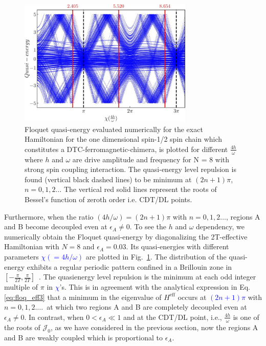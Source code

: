 \documentclass[%
nofootinbib,
reprint,
superscriptaddress,
amsmath,amssymb,showkeys,
aps,
prb,
]{revtex4-2}
\newcommand{\blue}[1]{\textcolor{blue}{#1}}
\begin{document}
	\begin{figure}
		\centering
		\includegraphics[width=8.3cm]{quasienergy_8_lores.jpeg}	
		\caption{Floquet quasi-energy evaluated numerically for the exact Hamiltonian for the one dimensional spin-1/2 spin chain which constitutes a DTC-ferromagnetic-chimera, is plotted for different $\frac{4h}{\omega}$ where $h$ and $\omega$ are drive amplitude and frequency for N = 8 with strong spin coupling interaction. The quasi-energy level repulsion is found (vertical black dashed lines) to be minimum at $(2n+1)\pi$, $n=0,1,2\dots$ The vertical red solid lines represent the roots of Bessel's function of zeroth order i.e. CDT/DL points.}
		\label{Fig:quasienergy}
	\end{figure}
	
	Furthermore, when the ratio $({4h}/{\omega}) = (2n+1)\pi$ with $n = 0,1,2\dots$, regions A and B become decoupled even at $\epsilon_A \neq 0$. To see the $h$ and $\omega$ dependency, we numerically obtain the Floquet quasi-energy by diagonalizing the 2T-effective Hamiltonian with $N=8$ and $\epsilon_A=0.03$. Its quasi-energies with different parameters \blue{$\chi( = {4h}/{\omega})$} are plotted in Fig.~\ref{Fig:quasienergy}. The distribution of the quasi-energy exhibits a regular periodic pattern confined in a Brillouin zone in $[-\frac{\pi}{2T}, \frac{\pi}{2T}]$~\cite{dutta2014}. The quasienergy level repulsion is the minimum at each odd integer multiple of $\pi$ in  \blue{$\chi$}'s. This is in agreement with the analytical expression in Eq.\eqref{eq:floq_eff3} that a minimum in the eigenvalue of $H^{\mathrm{eff}}$ occurs at \blue{$(2n+1)\pi$} with $n=0,1,2\dots$.\, at which two regions A and B are completely decoupled even at $\epsilon_A \neq 0$. In contrast, when $0 < \epsilon_A \ll 1 $ and at the CDT/DL point, i.e., $\frac{4h}{\omega}$ is one of the roots of $\mathcal{J}_0$, as we have considered in the previous section, now the regions A and B are weakly coupled which is proportional to $\epsilon_A$. 	
	
\end{document}
